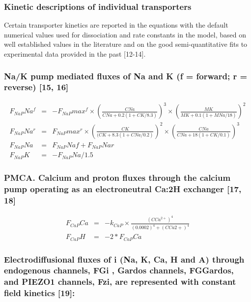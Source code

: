 \documentclass[a4paper]{article}
\newcommand{\med}[1]{M#1}
\newcommand{\cell}[1]{C#1}
\newcommand{\MNa}{\med{Na}}
\newcommand{\MK}{\med{K}}
\newcommand{\CNa}{\cell{Na}}
\newcommand{\CK}{\cell{K}}
\newcommand{\CCatp}{\cell{Ca^{2+}}}
\newcommand{\CCa}{\cell{Ca}}
\newcommand{\F}[2]{F_{#1}#2}
\newcommand{\kk}[2]{k_{#1}#2}
\begin{document}
\subsubsection{Kinetic descriptions of individual transporters}
Certain transporter kinetics are reported in the equations with the default numerical values used for dissociation and rate constants in the model, based on well established values in the literature and on the good semi-quantitative fits to experimental data provided in the past [12-14].  

\setcounter{equation}{0}
\renewcommand{\theequation}{11.\alph{equation}}


\subsubsection{Na/K pump mediated fluxes of Na and K (f = forward; r = reverse) [15, 16]}

\begin{eqnarray}
\F{NaP}{Na}^f  &=& -\F{NaP}{max}^f\times\left(\frac{\CNa}{\CNa + 0.2(1 + \CK/8.3)}\right)^3 \times\left(\frac{\MK}{\MK + 0.1(1 + \MNa/18)}\right)^2 \\
\F{NaP}{Na}^r  &=& \F{NaP}{max}^r\times\left(\frac{\CK}{(\CK + 8.3(1 + \CNa/0.2)}\right)^2\times\left(\frac{\CNa}{\CNa + 18(1 + \CK/0.1)}\right)^3 \\
\F{NaP}{Na} &=& \F{NaP}{Naf} + \F{NaP}{Nar} \\
\F{NaP}{K} &=& -\F{NaP}{Na}/1.5
\end{eqnarray}

\subsubsection{PMCA. Calcium and proton fluxes through the calcium pump operating as an electroneutral Ca:2H exchanger  [17, 18]}

\setcounter{equation}{0}
\renewcommand{\theequation}{12.\alph{equation}}

\begin{eqnarray}
\F{CaP}{Ca} &=& -\kk{CaP}{}\times\frac{(\CCatp)^4}{(0.0002)^4 + (\CCa2+)^4}\\
\F{CaP}{H} &=& -2*\F{CaP}{Ca}
\end{eqnarray}

\subsubsection{Electrodiffusional fluxes of i (Na, K, Ca, H and A) through endogenous channels, FGi , Gardos channels, FGGardos, and PIEZO1 channels, Fzi, are represented with constant field kinetics [19]: }
\end{document}
